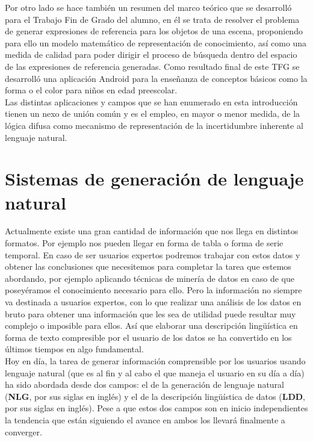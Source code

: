 \documentclass[10pt,a4paper]{article}
\begin{document}
Por otro lado se hace también un resumen del marco teórico que se desarrolló para el Trabajo Fin de Grado del alumno, en él se trata de resolver el problema de generar expresiones de referencia para los objetos de una escena, proponiendo para ello un modelo matemático de representación de conocimiento, así como una medida de calidad para poder dirigir el proceso de búsqueda dentro del espacio de las expresiones de referencia generadas. Como resultado final de este TFG se desarrolló una aplicación Android para la enseñanza de conceptos básicos como la forma o el color para niños en edad preescolar.\\

Las distintas aplicaciones y campos que se han enumerado en esta introducción tienen un nexo de unión común y es el empleo, en mayor o menor medida, de la lógica difusa como mecanismo de representación de la incertidumbre inherente al lenguaje natural.

\section{Sistemas de generación de lenguaje natural}

Actualmente existe una gran cantidad de información que nos llega en distintos formatos. Por ejemplo nos pueden llegar en forma de tabla o forma de serie temporal. En caso de ser usuarios expertos podremos trabajar con estos datos y obtener las conclusiones que necesitemos para completar la tarea que estemos abordando, por ejemplo aplicando técnicas de minería de datos en caso de que poseyéramos el conocimiento necesario para ello. Pero la información no siempre va destinada a usuarios expertos, con lo que realizar una análisis de los datos en bruto para obtener una información que les sea de utilidad puede resultar muy complejo o imposible para ellos. Así que elaborar una descripción lingüística en forma de texto compresible por el usuario de los datos se ha convertido en los últimos tiempos en algo fundamental.\\

Hoy en día, la tarea de generar información comprensible por los usuarios usando lenguaje natural (que es al fin y al cabo el que maneja el usuario en su día a día) ha sido abordada desde dos campos: el de la generación de lenguaje natural (\textbf{NLG}, por sus siglas en inglés) y el de la descripción lingüística de datos (\textbf{LDD}, por sus siglas en inglés). Pese a que estos dos campos son en inicio independientes la tendencia que están siguiendo el avance en ambos los llevará finalmente a converger.\\
\end{document}
